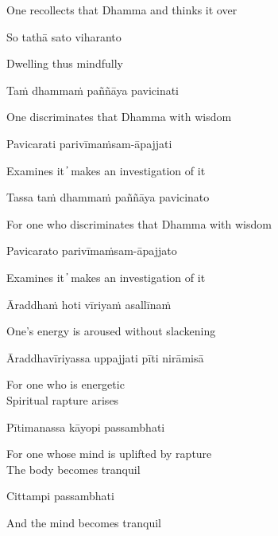 \begin{cprenglish}
One recollects that Dhamma and thinks it over
\end{cprenglish}

So tathā sato viharanto

\begin{cprenglish}
Dwelling thus mindfully
\end{cprenglish}

Taṁ dhammaṁ paññāya pavicinati

\begin{cprenglish}
One discriminates that Dhamma with wisdom
\end{cprenglish}

Pavicarati parivīmaṁsam-āpajjati

\begin{cprenglish}
Examines it  ̓  makes an investigation of it
\end{cprenglish}

Tassa taṁ dhammaṁ paññāya pavicinato

\begin{cprenglish}
For one who discriminates that Dhamma with wisdom
\end{cprenglish}

Pavicarato parivīmaṁsam-āpajjato

\begin{cprenglish}
Examines it  ̓  makes an investigation of it
\end{cprenglish}

Āraddhaṁ hoti vīriyaṁ asallīnaṁ

\begin{cprenglish}
One’s energy is aroused without slackening
\end{cprenglish}

Āraddhavīriyassa uppajjati pīti nirāmisā

\begin{cprenglish}
For one who is energetic\\
Spiritual rapture arises
\end{cprenglish}

Pītimanassa kāyopi passambhati

\begin{cprenglish}
For one whose mind is uplifted by rapture\\
The body becomes tranquil
\end{cprenglish}

Cittampi passambhati

\begin{cprenglish}
And the mind becomes tranquil
\end{cprenglish}

